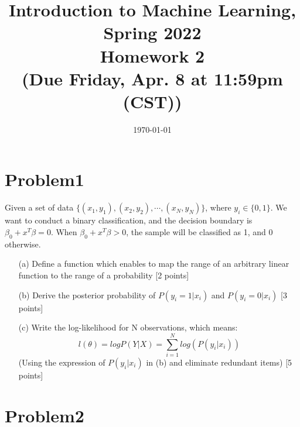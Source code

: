 \documentclass[10pt]{article}
\begin{document}
\date{\today}
\title{Introduction to Machine Learning, Spring 2022 \\
Homework 2\\
\small (Due Friday, Apr. 8 at 11:59pm (CST))}
\maketitle


\section{Problem1}
Given a set of data $\{(x_1, y_1), (x_2, y_2), \cdots, (x_N, y_N)\}$, where $y_i \in \{0, 1\}$. We want to conduct a binary classification, and the decision boundary is $\beta_0 + x^T\beta = 0$. When $\beta_0 + x^T\beta > 0$, the sample will be classified as 1, and 0 otherwise. 

\begin{enumerate}

\item[(a)]
Define a function which enables to map the range of an arbitrary linear function to the range of a probability {\color{red} [2 points]}\\

\item[(b)]
Derive the posterior probability of $P(y_i=1 | x_i)$ and $P(y_i=0 | x_i)$ {\color{red} [3 points]}\\

\item[(c)]
Write the log-likelihood for N observations, which means:
$$l(\theta) = logP(Y|X) = \sum_{i=1}^Nlog(P(y_i|x_i))$$
(Using the expression of $P(y_i|x_i)$ in (b) and eliminate redundant items) {\color{red} [5 points]}\\

\end{enumerate}
\newpage
\section{Problem2}
\end{document}
